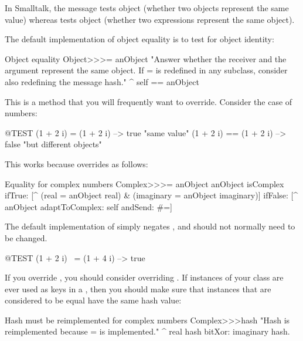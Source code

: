\documentclass[a4paper,10pt,twoside]{book}
\begin{document}
In Smalltalk, the message \ct{=} tests object  (\ie whether two objects represent the same value) whereas \ct{==} tests object  (\ie whether two expressions represent the same object).

The default implementation of object equality is to test for object identity:
\begin{method}{Object equality}
Object>>>= anObject
    "Answer whether the receiver and the argument represent the same object.
    If = is redefined in any subclass, consider also redefining the message hash."
    ^ self == anObject
\end{method}

This is a method that you will frequently want to override.
Consider the case of  numbers:

\begin{code}{@TEST}
(1 + 2 i) = (1 + 2 i)   --> true     "same value"
(1 + 2 i) == (1 + 2 i) --> false    "but different objects"
\end{code}

This works because  overrides \ct{=} as follows:
\begin{method}{Equality for complex numbers}
Complex>>>= anObject
    anObject isComplex
        ifTrue: [^ (real = anObject real) & (imaginary = anObject imaginary)]
        ifFalse: [^ anObject adaptToComplex: self andSend: #=]
\end{method}

The default implementation of  simply negates , and should not normally need to be changed.

\begin{code}{@TEST}
(1 + 2 i) ~= (1 + 4 i) --> true
\end{code}

If you override \ct{=}, you should consider overriding .
If instances of your class are ever used as keys in a , then you should make sure that instances that are considered to be equal have the same hash value:
\begin{method}{Hash must be reimplemented for complex numbers}
Complex>>>hash
    "Hash is reimplemented because = is implemented."
    ^ real hash bitXor: imaginary hash.
\end{method}
\end{document}
